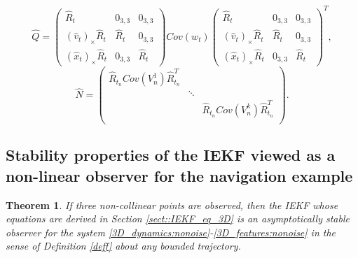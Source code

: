 \documentclass[a4paper,12pt,onecolumn]{article}
\newtheorem{thm}{Theorem}
\begin{document}
\[
\hat{Q}= \begin{pmatrix} \hat{R}_t & 0_{3,3} & 0_{3,3} \\ (\hat{v}_t)_\times \hat{R}_t & \hat{R}_t & 0_{3,3} \\ (\hat{x}_t)_\times \hat{R}_t & 0_{3,3} & \hat{R}_t \end{pmatrix} Cov(w_t) \begin{pmatrix} \hat{R}_t & 0_{3,3} & 0_{3,3} \\ (\hat{v}_t)_\times \hat{R}_t & \hat{R}_t & 0_{3,3} \\ (\hat{x}_t)_\times \hat{R}_t & 0_{3,3} & \hat{R}_t \end{pmatrix}^T ,
\]
\[
\hat{N} = \begin{pmatrix} \hat{R}_{t_n} Cov(V_n^1) \hat{R}_{t_n}^T & & \\ & \ddots & \\ &  &  \hat{R}_{t_n} Cov(V_n^k) \hat{R}_{t_n}^T \\  \end{pmatrix}.
\]

\subsection{Stability properties of the IEKF viewed as a non-linear observer for the navigation example}
\begin{thm}
\label{thm::3D_features_stability}
If three non-collinear points are observed, then the  IEKF whose equations are derived in Section \ref{sect::IEKF_eq_3D} is an asymptotically stable observer for the system \eqref{3D_dynamics:nonoise}-\eqref{3D_features:nonoise}   in the sense of Definition \ref{deff} about \emph{any} bounded trajectory.
\end{thm}
\end{document}
